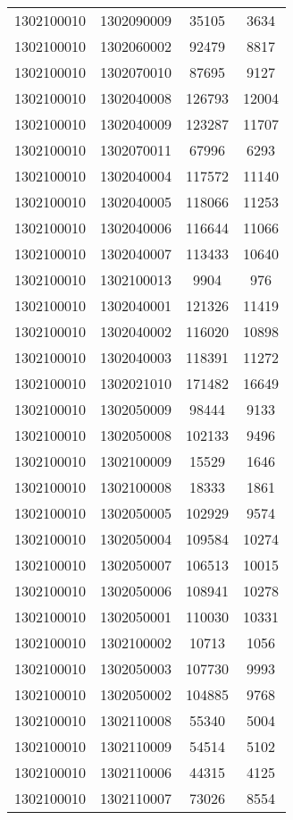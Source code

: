 \begin{longtable}[h]{llcc}
		1302100010 & 1302090009 & 35105 & 3634\\
		1302100010 & 1302060002 & 92479 & 8817\\
		1302100010 & 1302070010 & 87695 & 9127\\
		1302100010 & 1302040008 & 126793 & 12004\\
		1302100010 & 1302040009 & 123287 & 11707\\
		1302100010 & 1302070011 & 67996 & 6293\\
		1302100010 & 1302040004 & 117572 & 11140\\
		1302100010 & 1302040005 & 118066 & 11253\\
		1302100010 & 1302040006 & 116644 & 11066\\
		1302100010 & 1302040007 & 113433 & 10640\\
		1302100010 & 1302100013 & 9904 & 976\\
		1302100010 & 1302040001 & 121326 & 11419\\
		1302100010 & 1302040002 & 116020 & 10898\\
		1302100010 & 1302040003 & 118391 & 11272\\
		1302100010 & 1302021010 & 171482 & 16649\\
		1302100010 & 1302050009 & 98444 & 9133\\
		1302100010 & 1302050008 & 102133 & 9496\\
		1302100010 & 1302100009 & 15529 & 1646\\
		1302100010 & 1302100008 & 18333 & 1861\\
		1302100010 & 1302050005 & 102929 & 9574\\
		1302100010 & 1302050004 & 109584 & 10274\\
		1302100010 & 1302050007 & 106513 & 10015\\
		1302100010 & 1302050006 & 108941 & 10278\\
		1302100010 & 1302050001 & 110030 & 10331\\
		1302100010 & 1302100002 & 10713 & 1056\\
		1302100010 & 1302050003 & 107730 & 9993\\
		1302100010 & 1302050002 & 104885 & 9768\\
		1302100010 & 1302110008 & 55340 & 5004\\
		1302100010 & 1302110009 & 54514 & 5102\\
		1302100010 & 1302110006 & 44315 & 4125\\
		1302100010 & 1302110007 & 73026 & 8554\\

\end{longtable}
